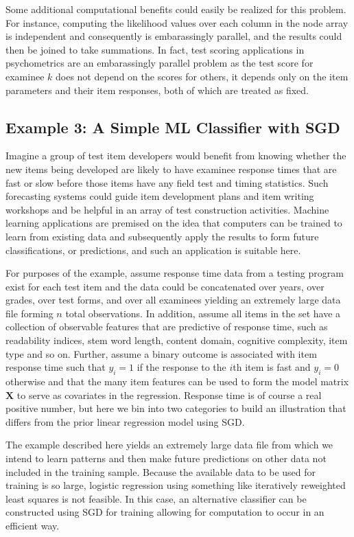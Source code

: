 \documentclass[12pt]{article}
\begin{document}
Some additional computational benefits could easily be realized for this problem. For instance, computing the likelihood values over each column in the node array is independent and consequently is embarassingly parallel, and the results could then be joined to take summations. In fact, test scoring applications in psychometrics are an embarassingly parallel problem as the test score for examinee $k$ does not depend on the scores for others, it depends only on the item parameters and their item responses, both of which are treated as fixed. 

\subsection*{Example 3: A Simple ML Classifier with SGD}

Imagine a group of test item developers would benefit from knowing whether the new items being developed are likely to have examinee response times that are fast or slow before those items have any field test and timing statistics. Such forecasting systems could guide item development plans and item writing workshops and be helpful in an array of test construction activities. Machine learning applications are premised on the idea that computers can be trained to learn from existing data and subsequently apply the results to form future classifications, or predictions, and such an application is suitable here.

For purposes of the example, assume response time data from a testing program exist for each test item and the data could be concatenated over years, over grades, over test forms, and over all examinees yielding an extremely large data file forming $n$ total observations. In addition, assume all items in the set have a collection of observable features that are predictive of response time, such as readability indices, stem word length, content domain, cognitive complexity, item type and so on. Further, assume a binary outcome is associated with item response time such that $y_{i} = 1$ if the response to the $i$th item is fast and $y_{i}=0$ otherwise and that the many item features can be used to form the model matrix $\bm{X}$ to serve as covariates in the regression. Response time is of course a real positive number, but here we bin into two categories to build an illustration that differs from the prior linear regression model using SGD.   

The example described here yields an extremely large data file from which we intend to learn patterns and then make future predictions on other data not included in the training sample. Because the available data to be used for training is so large, logistic regression using something like iteratively reweighted least squares is not feasible. In this case, an alternative classifier can be constructed using SGD for training allowing for computation to occur in an efficient way. 
\end{document}
